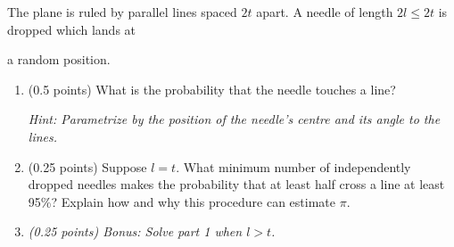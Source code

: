 \documentclass[a4paper]{report}
\begin{document}
\begin{problem}
The plane is ruled by parallel lines spaced $2t$ apart. A needle of length $2l\leq2t$ is dropped
which lands at

a random position.
\begin{enumerate}
    \item (0.5 points) What is the probability that the needle touches a line?

\textit{Hint: Parametrize by the position of the needle's centre and its angle to the lines.}

    \item (0.25 points) Suppose $l=t$.
    What minimum number of independently dropped needles makes the probability that at least half cross a line at least 95\%?
Explain how and why this procedure can estimate $\pi$.

\item \textit{(0.25 points) Bonus: Solve part 1 when $l>t$.}
\end{enumerate}

\end{problem}
\end{document}
